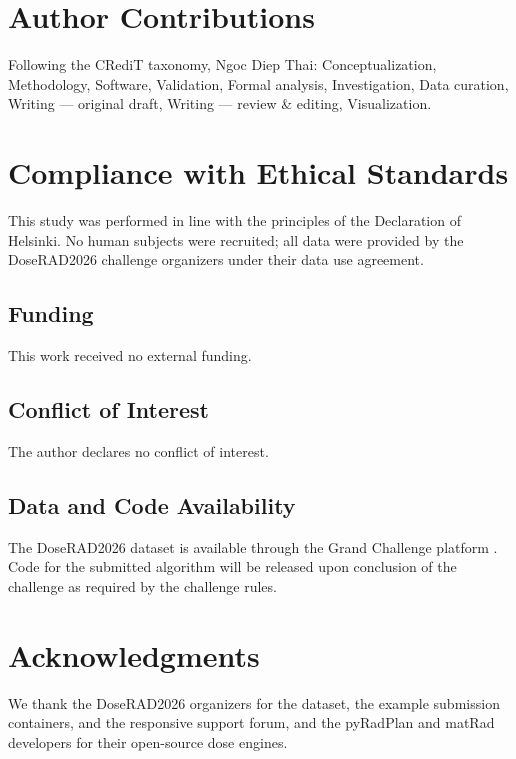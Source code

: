 \documentclass[runningheads]{llncs}
\begin{document}
\section{Author Contributions}
Following the CRediT taxonomy, Ngoc Diep Thai: Conceptualization, Methodology, Software, Validation, Formal analysis, Investigation, Data curation, Writing --- original draft, Writing --- review \& editing, Visualization.

\section{Compliance with Ethical Standards}
This study was performed in line with the principles of the Declaration of Helsinki. No human subjects were recruited; all data were provided by the DoseRAD2026 challenge organizers under their data use agreement.

\subsection*{Funding}
This work received no external funding.

\subsection*{Conflict of Interest}
The author declares no conflict of interest.

\subsection*{Data and Code Availability}
The DoseRAD2026 dataset is available through the Grand Challenge platform \cite{doserad_data}. Code for the submitted algorithm will be released upon conclusion of the challenge as required by the challenge rules.

\section*{Acknowledgments}
We thank the DoseRAD2026 organizers for the dataset, the example submission containers, and the responsive support forum, and the pyRadPlan and matRad developers for their open-source dose engines.
\end{document}
